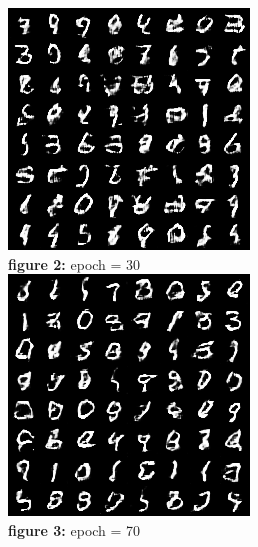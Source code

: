 \documentclass{article}
\theoremstyle{definition}
\theoremstyle{remark}
\begin{document}
\begin{enumerate}[font={\Large\bfseries}]
\begin{center}
			\includegraphics[scale=0.9]{test_30.png}\\
			\textbf{figure 2:} epoch = 30\\

			\includegraphics[scale=0.9]{test_70.png}\\
			\textbf{figure 3:} epoch = 70\\

		\end{center}
	\end{enumerate}
\end{document}
